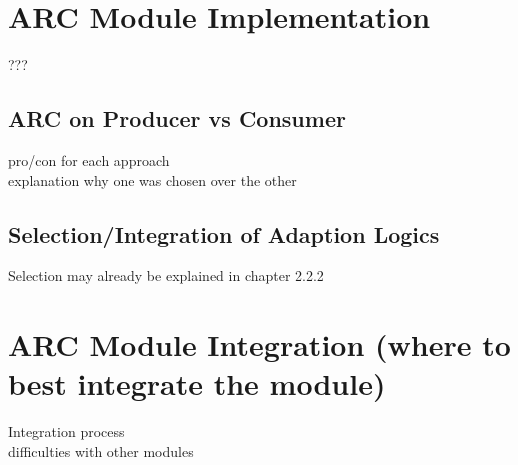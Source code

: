 \section{ARC Module Implementation}
???

\subsection{ARC on Producer vs Consumer}
pro/con for each approach \\
explanation why one was chosen over the other

\subsection{Selection/Integration of Adaption Logics}
Selection may already be explained in chapter 2.2.2


\section{ARC Module Integration (where to best integrate the module)}
Integration process \\
difficulties with other modules

